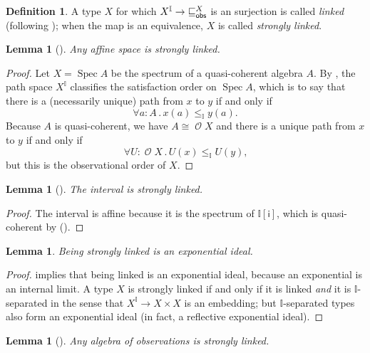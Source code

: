 \documentclass[a4paper,12pt]{amsart}
\newtheorem{lemma}[theorem]{Lemma}
\theoremstyle{definition}
\newtheorem{definition}[theorem]{Definition}
\newcommand{\mc}[1]{\mathcal{#1}}
\newcommand{\mbb}[1]{\mathbb{#1}}
\newcommand{\I}{\mbb I}
\newcommand{\ms}[1]{\mathsf{#1}}
\newcommand{\fa}[2]{\forall #1\!\colon\!\!#2\mathpunct{.}}
\newcommand{\spec}{\operatorname{Spec}}
\newcommand{\opens}{\operatorname{\mc{O}}} %
\begin{document}
\begin{definition}
  A type $X$ for which $X^\I\to {\obsle[X]}$ is an surjection is called \emph{linked} (following \citet{PhoaWesleyKym-Son1991DtiR}); when the map is an equivalence, $X$ is called \emph{strongly linked}.
\end{definition}

\begin{lemma}[\AxiomSQCP]\label{lem:affine-strongly-linked}
  Any affine space is strongly linked.
\end{lemma}

\begin{proof}
  Let $X=\spec{A}$ be the spectrum of a quasi-coherent algebra $A$. 
  By , the path space $X^\I$ classifies the satisfaction order on $\spec{A}$, which is to say that there is a (necessarily unique) path from $x$ to $y$ if and only if \[\fa{a}{A} x(a)\le_\I y(a)\text{.}\] Because $A$ is quasi-coherent, we have $A\cong \opens X$ and there is a unique path from $x$ to $y$ if and only if \[\fa{U}{\opens{X}} U(x)\le_\I U(y)\text{,}\] but this is the observational order of $X$.
\end{proof}

\begin{lemma}[\AxiomSQCP]\label{lem:int-strong-link}
  The interval is strongly linked.
\end{lemma}

\begin{proof}
  The interval is affine because it is the spectrum of $\I[\ms{i}]$, which is quasi-coherent by (\AxiomSQCP).
\end{proof}

\begin{lemma}\label{lem:strong-link-exp-ideal}
  Being strongly linked is an exponential ideal.
\end{lemma}

\begin{proof}
  \citet[Prop.\ 5.4.4]{PhoaWesleyKym-Son1991DtiR} implies that being linked is an exponential ideal, because an exponential is an internal limit. A type $X$ is strongly linked if and only if it is linked \emph{and} it is $\I$-separated in the sense that $X^\I\to X\times X$ is an embedding; but $\I$-separated types also form an exponential ideal (in fact, a reflective exponential ideal).
\end{proof}

\begin{lemma}[\AxiomSQCP]\label{lem:O-strongly-linked}
  Any algebra of observations is strongly linked.
\end{lemma}
\end{document}
